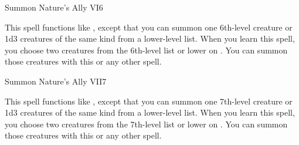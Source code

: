 \begin{spellsection}{Summon Nature's Ally VI}{6}
    \begin{spellheader}
    \end{spellheader}
    \begin{spellcontent}
        \begin{spelltargetinginfo}
        \end{spelltargetinginfo}
        \begin{spelleffects}
            \spellspecial This spell functions like , except that you can summon one 6th-level creature or 1d3 creatures of the same kind from a lower-level list. When you learn this spell, you choose two creatures from the 6th-level list or lower on . You can summon those creatures with this or any other  spell.
            \spelldur \durshort \dismissable
        \end{spelleffects}
    \end{spellcontent}
    \begin{spellfooter}
        \miscastexplode
    \end{spellfooter}
\end{spellsection}

\begin{spellsection}{Summon Nature's Ally VII}{7}
    \begin{spellheader}
    \end{spellheader}
    \begin{spellcontent}
        \begin{spelltargetinginfo}
        \end{spelltargetinginfo}
        \begin{spelleffects}
            \spellspecial This spell functions like , except that you can summon one 7th-level creature or 1d3 creatures of the same kind from a lower-level list. When you learn this spell, you choose two creatures from the 7th-level list or lower on . You can summon those creatures with this or any other  spell.
            \spelldur \durshort \dismissable
        \end{spelleffects}
    \end{spellcontent}
    \begin{spellfooter}
        \miscastexplode
    \end{spellfooter}
\end{spellsection}

